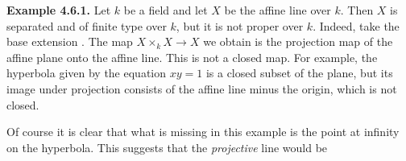 {\medskip
\noindent\hypertarget{result-II-4.6.1}{}\textbf{Example 4.6.1.} Let $k$ be a field and let $X$ be the affine line over $k$. Then $X$ is separated and of finite type over $k$, but it is not proper over $k$. Indeed, take the base extension \hypertarget{err-II-4-6-1}{}. The map $X\times_k X\to X$ we obtain is the projection map of the affine plane onto the affine line. This is not a closed map. For example, the hyperbola given by the equation $xy=1$ is a closed subset of the plane, but its image under projection consists of the affine line minus the origin, which is not closed.

Of course it is clear that what is missing in this example is the point at infinity on the hyperbola. This suggests that the \emph{projective} line would be
}
